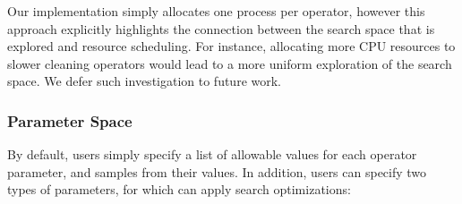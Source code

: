 Our implementation simply allocates one process per operator, however this approach explicitly highlights the connection between the search space that is explored and resource scheduling.  For instance, allocating more CPU resources to slower cleaning operators would lead to a more uniform exploration of the search space.  We defer such investigation to future work.






\subsubsection{Parameter Space}
By default, users simply specify a list of allowable values for each operator parameter, and \sys samples from their values.  In addition, users can specify two types of parameters, for which \sys can apply search optimizations:

